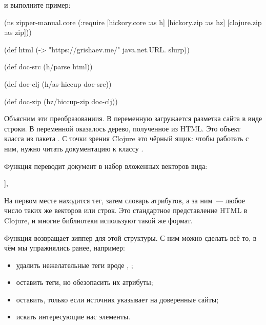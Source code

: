 \begin{english}
  \begin{clojure}
[hickory "0.7.1"]
  \end{clojure}
\end{english}

\noindent
и выполните пример:

\begin{english}
  \begin{clojure}
(ns zipper-manual.core
  (:require
   [hickory.core :as h]
   [hickory.zip :as hz]
   [clojure.zip :as zip]))

(def html (-> "https://grishaev.me/"
              java.net.URL.
              slurp))

(def doc-src
  (h/parse html))

(def doc-clj
  (h/as-hiccup doc-src))

(def doc-zip
  (hz/hiccup-zip doc-clj))
  \end{clojure}
\end{english}

Объясним эти преобразованиия. В переменную  загружается разметка сайта в
виде строки. В переменной  оказалось дерево, полученное из HTML. Это
объект класса  из пакета . С точки зрения Clojure это
чёрный ящик: чтобы работать с ним, нужно читать документацию к классу
.

Функция  переводит документ в набор вложенных векторов вида:

\begin{english}
  \begin{clojure}
[:tag {:attr "value"} & [...]],
  \end{clojure}
\end{english}


На первом месте находится тег, затем словарь атрибутов, а за ним~--- любое число
таких же векторов или строк. Это стандартное представление HTML в Clojure, и
многие библиотеки используют такой же формат.


Функция  возвращает зиппер для этой структуры. С ним можно
сделать всё то, в чём мы упражнялись ранее, например:

\begin{itemize}

\item
  удалить нежелательные теги вроде , ;

\item
  оставить теги, но обезопасить их атрибуты;

\item
  оставить, только если источник указывает на доверенные сайты;

\item
  искать интересующие нас элементы.

\end{itemize}

